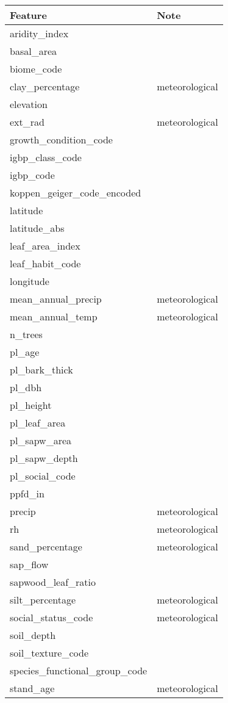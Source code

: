 \begin{tabular}{ll}
\hline\textbf{Feature} & \textbf{Note} \\ \hline
aridity\_index &  \\ 
basal\_area &  \\ 
biome\_code &  \\ 
clay\_percentage & meteorological \\ 
elevation &  \\ 
ext\_rad & meteorological \\ 
growth\_condition\_code &  \\ 
igbp\_class\_code &  \\ 
igbp\_code &  \\ 
koppen\_geiger\_code\_encoded &  \\ 
latitude &  \\ 
latitude\_abs &  \\ 
leaf\_area\_index &  \\ 
leaf\_habit\_code &  \\ 
longitude &  \\ 
mean\_annual\_precip & meteorological \\ 
mean\_annual\_temp & meteorological \\ 
n\_trees &  \\ 
pl\_age &  \\ 
pl\_bark\_thick &  \\ 
pl\_dbh &  \\ 
pl\_height &  \\ 
pl\_leaf\_area &  \\ 
pl\_sapw\_area &  \\ 
pl\_sapw\_depth &  \\ 
pl\_social\_code &  \\ 
ppfd\_in &  \\ 
precip & meteorological \\ 
rh & meteorological \\ 
sand\_percentage & meteorological \\ 
sap\_flow &  \\ 
sapwood\_leaf\_ratio &  \\ 
silt\_percentage & meteorological \\ 
social\_status\_code & meteorological \\ 
soil\_depth &  \\ 
soil\_texture\_code &  \\ 
species\_functional\_group\_code &  \\ 
stand\_age & meteorological \\ 

\end{tabular}
